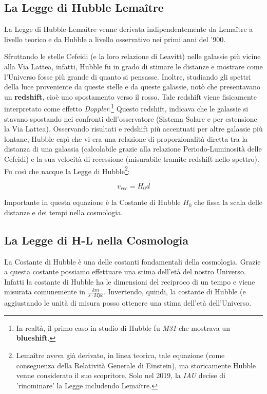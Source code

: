 \documentclass{article}
\begin{document}
\subsection{La Legge di Hubble Lemaître}

La Legge di Hubble-Lemaître venne derivata indipendentemente da
Lemaître a livello teorico e da Hubble a livello osservativo nei primi
anni del '900.

Sfruttando le stelle Cefeidi (e la loro relazione di Leavitt) nelle galassie più vicine alla Via
Lattea, infatti, Hubble fu in grado di stimare le distanze e mostrare
come l'Universo fosse più grande di quanto si pensasse. Inoltre,
studiando gli spettri della luce proveniente da queste stelle e da queste galassie,
notò che presentavano un \textbf{redshift}, cioè uno spostamento verso
il rosso. Tale redshift viene fisicamente interpretato come effetto \emph{Doppler}.\footnote{In realtà, il primo caso in studio di Hubble fu
  \emph{M31} che mostrava un \textbf{blueshift}.}
Questo redshift, indicava che le galassie si stavano spostando nei
confronti dell'osservatore (Sistema Solare e per estensione la Via
Lattea). Osservando risultati e redshift più accentuati per altre galassie più lontane,
Hubble capì che vi era una relazione di proporzionalità diretta tra la
distanza di una galassia (calcolabile grazie alla relazione
Periodo-Luminosità delle Cefeidi) e la sua velocità di recessione
(misurabile tramite redshift nello spettro). Fu così che nacque la
Legge di Hubble\footnote{Lemaître aveva già derivato, in linea teorica, tale equazione (come
conseguenza della Relatività Generale di Einstein), ma storicamente
Hubble venne considerato il suo scopritore. Solo nel 2019, la
\emph{IAU} decise di 'rinominare' la Legge includendo Lemaître.}:

\begin{equation}
  v_{rec} = H_0 d
\end{equation}

Importante in questa equazione è la Costante di Hubble $H_0$ che fissa
la scala delle distanze e dei tempi nella cosmologia.
\clearpage

\subsection{La Legge di H-L nella Cosmologia}

La Costante di Hubble è una delle costanti fondamentali della
cosmologia. Grazie a questa costante possiamo effettuare una stima
dell'età del nostro Universo. Infatti la costante di Hubble ha le
dimensioni del reciproco di un tempo e viene misurata comunemente in
$\frac{km}{s\cdot Mpc}$. Invertendo, quindi, la costante di Hubble (e
aggiustando le unità di misura posso ottenere una stima dell'età
dell'Universo.
\end{document}
